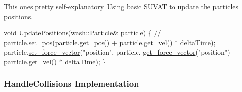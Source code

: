 This one\textquotesingle{}s pretty self-\/explanatory. Using basic S\+U\+V\+AT to update the particles\textquotesingle{} positions. 
\begin{DoxyCode}
\textcolor{keywordtype}{void} UpdatePositions(\mbox{\hyperlink{classwash_1_1Particle}{wash::Particle}}& particle) \{
    \textcolor{comment}{// particle.set\_pos(particle.get\_pos() + particle.get\_vel() * deltaTime);}
    particle.\mbox{\hyperlink{classwash_1_1Particle_a6960cdd169d1829a52e49cf835a8bfeb}{set\_force\_vector}}(\textcolor{stringliteral}{"position"}, particle.
      \mbox{\hyperlink{classwash_1_1Particle_a9c6ec5d5a7407897ecca00549bd05c01}{get\_force\_vector}}(\textcolor{stringliteral}{"position"}) + particle.\mbox{\hyperlink{classwash_1_1Particle_a890d0f1467225393e385872b0c98b974}{get\_vel}}() * 
      \mbox{\hyperlink{3d__fluid__sim_2fluid__sim_8cpp_a78e0adba8d27825f587ec87ed578015f}{deltaTime}});
\}
\end{DoxyCode}


\subsubsection*{Handle\+Collisions Implementation}

